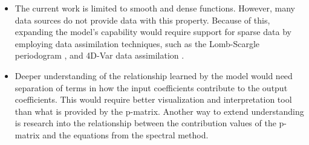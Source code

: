 \begin{itemize}
    \item The current work is limited to smooth and dense functions. However, many data sources do not provide data with this property. Because of this, expanding the model's capability would require support for sparse data by employing data assimilation techniques, such as the Lomb-Scargle periodogram \autocite{vanderplasUnderstandingLombScargle2018}, and 4D-Var data assimilation \autocite{puNumericalWeatherPrediction2018,parkDataAssimilationAtmospheric2013}.
    \item Deeper understanding of the relationship learned by the model would need separation of terms in how the input coefficients contribute to the output coefficients. This would require better visualization and interpretation tool than what is provided by the p-matrix. Another way to extend understanding is research into the relationship between the contribution values of the p-matrix and the equations from the spectral method.
\end{itemize}
